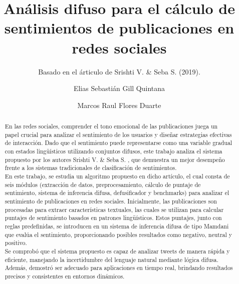 \documentclass[sigconf, review=false, nonacm]{acmart}
\begin{document}
\title{Análisis difuso para el cálculo de sentimientos de publicaciones en redes sociales} \subtitle{Basado en
	el árticulo de Srishti V. \& Seba S. (2019).}

\author{Elias Sebastián Gill Quintana}

\author{Marcos Raul Flores Duarte}


\begin{abstract}
	En las redes sociales, comprender el tono emocional de las publicaciones juega un papel crucial para
	analizar el sentimiento de los usuarios y diseñar estrategias efectivas de interacción. Dado que el
	sentimiento puede representarse como una variable gradual con estados lingüísticos utilizando conjuntos
	difusos, este trabajo analiza el sistema propuesto por los autores Srishti V. \& Seba S. \cite{paper}, que
	demuestra un mejor desempeño frente a los sistemas tradicionales de clasificación de sentimientos.\\

	En este trabajo, se estudia un algoritmo propuesto en dicho artículo, el cual consta de seis módulos
	(extracción de datos, preprocesamiento, cálculo de puntaje de sentimiento, sistema de inferencia difusa,
	defusificador y benchmarks) para analizar el sentimiento de publicaciones en redes sociales. Inicialmente, las
	publicaciones son procesadas para extraer características textuales, las cuales se utilizan para calcular
	puntajes de sentimiento basados en patrones lingüísticos. Estos puntajes, junto con reglas predefinidas,
	se introducen en un sistema de inferencia difusa de tipo Mamdani que evalúa el sentimiento, proporcionando
	posibles resultados como negativo, neutral y positivo.\\

	Se comprobó que el sistema propuesto es capaz de analizar tweets de manera rápida y eficiente, manejando
	la incertidumbre del lenguaje natural mediante lógica difusa. Además, demostró ser adecuado para
	aplicaciones en tiempo real, brindando resultados precisos y consistentes en entornos dinámicos.
\end{abstract}
\end{document}
